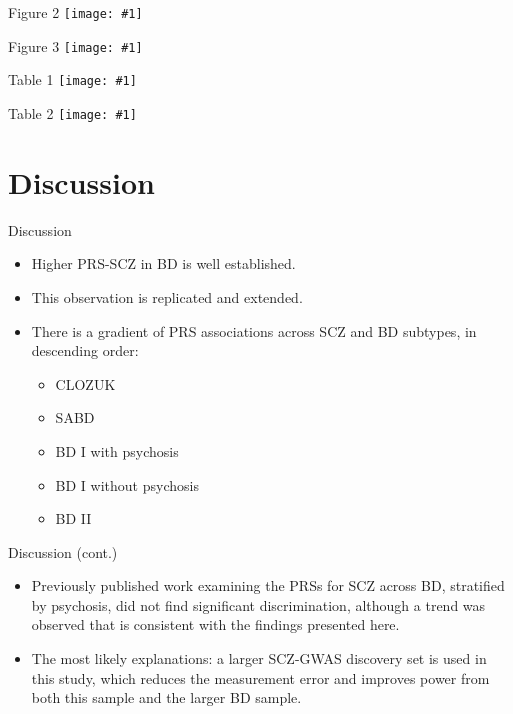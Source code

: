 \documentclass{beamer}
\newcommand*{\solo}[1]{\centering\texttt{[image: \#1]}}
\begin{document}
\begin{frame}{Figure 2}
    \solo{F2.eps}
\end{frame}

\begin{frame}{Figure 3}
    \solo{F3.eps}
\end{frame}

\begin{frame}{Table 1}
    \solo{T1.eps}
\end{frame}

\begin{frame}{Table 2}
    \solo{T2.eps}
\end{frame}

\section{Discussion}
\begin{frame}{Discussion}
    \begin{itemize}
        \item Higher PRS-SCZ in BD is well established.
        \item This observation is replicated and extended.
        \item There is a gradient of PRS associations across SCZ and BD subtypes,
            in descending order:
            \begin{itemize}
                \item CLOZUK
                \item SABD
                \item BD I with psychosis
                \item BD I without psychosis
                \item BD II
            \end{itemize}
    \end{itemize}
\end{frame}

\begin{frame}{Discussion (cont.)}
    \begin{itemize}
        \item Previously published work examining the PRSs for SCZ across BD,
              stratified by psychosis, did not find significant discrimination,
              although a trend was observed that is consistent with the
              findings presented here. 
        \item The most likely explanations: a larger SCZ-GWAS discovery set is
              used in this study, which reduces the measurement error and
              improves power from both this sample and the larger BD sample.
    \end{itemize}
\end{frame}
\end{document}
